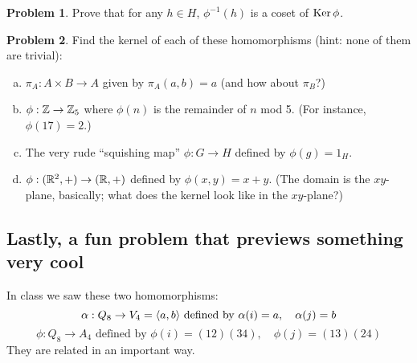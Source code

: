 \documentclass[12pt]{article}
\theoremstyle{definition} %
\newtheorem{problem}{Problem}
\newcommand\inv{^{-1}} %
\begin{document}
\begin{problem}
    Prove that for any $h\in H$, $\phi\inv(h)$ is a coset of $\operatorname{Ker}\phi$.
\end{problem}

\begin{problem}
    Find the kernel of each of these homomorphisms (hint: none of them are trivial):
    \begin{enumerate}[(a)]
        \item $\pi_A:A\times B\to A$ given by $\pi_A(a,b) = a$ (and how about $\pi_B$?)
        \item $\phi:\mathbb{Z} \to \mathbb{Z}_5$ where $\phi(n)$ is the remainder of $n$ mod 5. (For instance, $\phi(17) = 2$.)
        \item The very rude ``squishing map'' $\phi:G\to H$ defined by $\phi(g) = 1_H$.
        \item $\phi:(\mathbb{R}^2, +)\to (\mathbb{R}, +)$ defined by $\phi(x, y) = x+y$. (The domain is the $xy$-plane, basically; what does the kernel look like in the $xy$-plane?)
    \end{enumerate}
\end{problem}

\pagebreak
\subsection*{Lastly, a fun problem that previews something very cool}

In class we saw these two homomorphisms: 
\[\alpha:Q_8 \to V_4 = \langle a, b\rangle \text{ defined by }\alpha(i) = a, \quad \alpha(j) = b\] 
\[\phi: Q_8 \to A_4 \text{ defined by }\phi(i) = (12)(34),\quad  \phi(j) = (13)(24)\] They are related in an important way.
\end{document}
